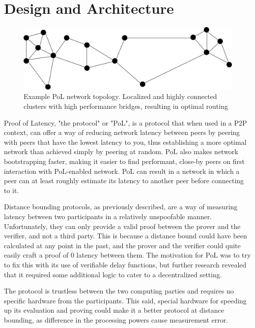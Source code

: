 \chapter{Design and Architecture}
\label{Proof of Latency}
\begin{figure}
  \includegraphics[width=\textwidth]{pictures/pol_topology.pdf}
  \caption{Example PoL network topology. Localized and highly connected clusters with high performance bridges, resulting in optimal routing}
  \label{PoL Example Topology}
\end{figure}

Proof of Latency, "the protocol" or "PoL", is a protocol that when used in a P2P context, can offer a way of reducing network latency between peers by peering with peers that have the lowest latency to you, thus establishing a more optimal network than achieved simply by peering at random. PoL also makes network bootstrapping faster, making it easier to find performant, close-by peers on first interaction with PoL-enabled network. PoL can result in a network in which a peer can at least roughly estimate its latency to another peer before connecting to it.

Distance bounding protocols, as previously described, are a way of measuring latency between two participants in a relatively unspoofable manner. Unfortunately, they can only provide a valid proof between the prover and the verifier, and not a third party. This is because a distance bound could have been calculated at any point in the past, and the prover and the verifier could quite easily craft a proof of 0 latency between them. The motivation for PoL was to try to fix this with its use of verifiable delay functions, but further research revealed that it required some additional logic to cater to a decentralized setting.

The protocol is trustless between the two computing parties and requires no specific hardware from the participants. This said, special hardware for speeding up its evaluation and proving could make it a better protocol at distance bounding, as difference in the processing powers cause measurement error.

